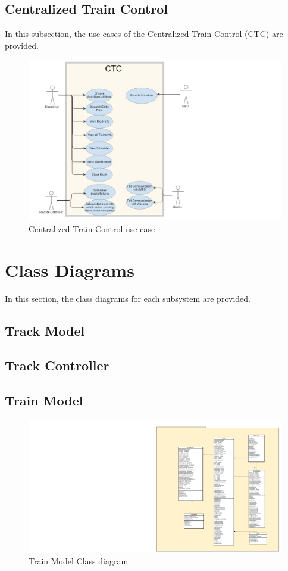 \documentclass[]{article}
\begin{document}
\subsection{Centralized Train Control}
In this subsection, the use cases of the Centralized Train Control (CTC) are provided.
\begin{figure}[H]
	\centering
	\includegraphics[scale=.5]{ctcusecase.png}
	\caption{Centralized Train Control use case}
\end{figure}

\section{Class Diagrams}
In this section, the class diagrams for each subsystem are provided.
\subsection{Track Model}
\subsection{Track Controller}
\subsection{Train Model}
\begin{figure}[H]
	\centering
	\includegraphics[scale=.5]{trainmodelclassdiagram.png}
	\caption{Train Model Class diagram}
\end{figure}
\end{document}
